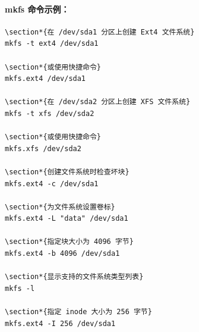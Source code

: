 \documentclass[12pt,UTF8]{ctexbook}
\begin{document}
\paragraph{mkfs 命令示例：}
\begin{verbatim}
\section*{在 /dev/sda1 分区上创建 Ext4 文件系统}
mkfs -t ext4 /dev/sda1

\section*{或使用快捷命令}
mkfs.ext4 /dev/sda1

\section*{在 /dev/sda2 分区上创建 XFS 文件系统}
mkfs -t xfs /dev/sda2

\section*{或使用快捷命令}
mkfs.xfs /dev/sda2

\section*{创建文件系统时检查坏块}
mkfs.ext4 -c /dev/sda1

\section*{为文件系统设置卷标}
mkfs.ext4 -L "data" /dev/sda1

\section*{指定块大小为 4096 字节}
mkfs.ext4 -b 4096 /dev/sda1

\section*{显示支持的文件系统类型列表}
mkfs -l

\section*{指定 inode 大小为 256 字节}
mkfs.ext4 -I 256 /dev/sda1
\end{verbatim}
\end{document}
